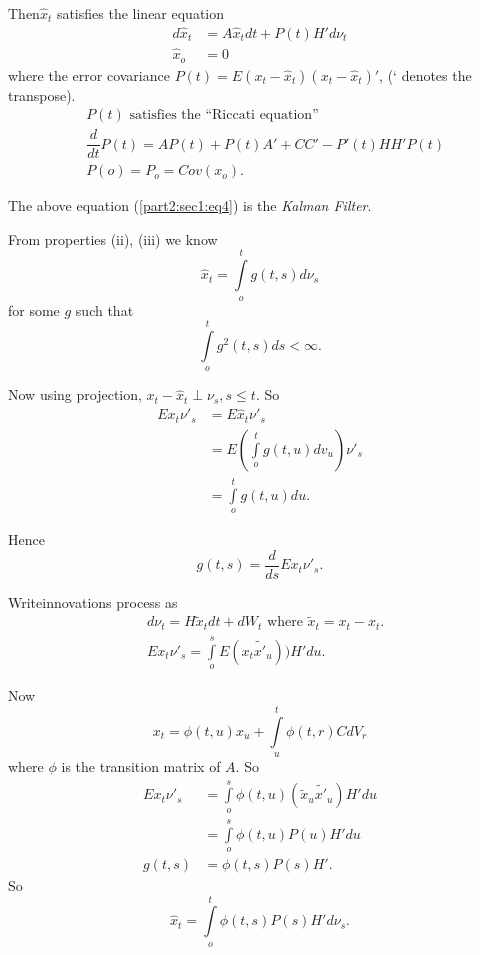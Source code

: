 Then\pageoriginale $\hat{x}_t$ satisfies the linear equation
\begin{align*}
  d \hat{x}_t & = A \hat{x}_t dt + P(t) H' d \nu_t\\
  \hat{x}_o & = 0 \tag{4}\label{part2:sec1:eq4}
\end{align*}
where the error covariance $P(t)=E(x_t- \hat{x}_t)(x_t- \hat{x}_t)'$, (`
denotes the transpose). 
\begin{align*}
  & P(t) \text{ satisfies the ``Riccati equation'' }\\
  & \dfrac{d}{dt}P(t)= AP(t)+ P(t)A' +CC'- P'(t)HH'P(t)\\
  & P(o)= P_o=Cov (x_o).
\end{align*} 
 
 The above equation (\ref{part2:sec1:eq4}) is the \textit{Kalman Filter}.
 
\medskip
 From  properties (ii), (iii) we know  
 $$
 \hat{x}_t = \int\limits_{o}^t g(t,s)d \nu_s
 $$
 for some $g$ such that 
 $$
 \int\limits_{o}^t g^2(t,s) ds < \infty.
 $$
 
 Now using projection, $x_t -\hat{x}_t \perp \nu_s, s \le t$. So
 \begin{align*}
   Ex_t \nu'_s &= E \hat{x}_t \nu'_s \\
   &= E\left( \int\limits_{o}^t g(t,u)dv_u \right)\nu'_s\\
   &= \int\limits_{o}^t g(t,u) du.
 \end{align*} 
 
 Hence
 $$
 g(t,s)= \frac{d}{ds}Ex_t \nu'_s.
 $$
 
 Write\pageoriginale innovations process as 
 \begin{align*}
   &d\nu_t = H \tilde{x}_t dt+ dW_t \text{ where } \tilde{x}_t = x_t -
   \hat{x}_t.\\ 
   &E x_t \nu'_s = \int\limits_{o}^s E(x_t \tilde{x'}_u))H' du.
 \end{align*}
 
 Now
 $$
 x_t = \phi(t,u) x_u + \int\limits_{u}^t \phi(t,r) C dV_r
 $$
 where $\phi$ is the transition matrix of $A$. So
 \begin{align*}
   E x_t \nu'_s &= \int\limits_{o}^s  \phi (t, u) (\tilde{x}_u
   \tilde{x'}_u) H' du\\ 
   &= \int\limits_{o}^s \phi (t,u) P(u) H' du\\
   g(t,s)&= \phi(t,s) P(s) H'.
 \end{align*}  
  So
  $$
  \hat{x}_t = \int\limits_{o}^t \phi(t,s) P(s) H' d \nu_s.
  $$
  

